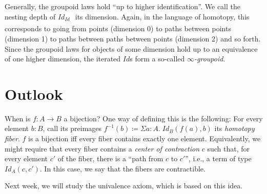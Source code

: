 \documentclass{article} \usepackage{chtt-notes} \usepackage{stmaryrd}
\begin{document}
Generally, the groupoid laws hold ``up to higher identification''.
We call the nesting depth of $\mathit{Id}_{\mathit{Id}_{._{._{.}}}}$ its dimension.
Again, in the language of homotopy, this corresponds to going from points (dimension 0) to paths between points (dimension 1) to paths between paths between points (dimension 2) and so forth.
Since the groupoid laws for objects of some dimension hold up to an equivalence of one higher dimension, the iterated $\mathit{Id}$s form a so-called \emph{$\infty$-groupoid}.

\section{Outlook}
When is $f : A \to B$ a bijection?
One way of defining this is the following:
For every element $b : B$, call its preimages $f^{-1}(b) \coloneqq \Sigma a: A. \; \mathit{Id}_{B}(f(a), b)$ its \emph{homotopy fiber}.
$f$ is a bijection iff every fiber contains exactly one element.
Equivalently, we might require that every fiber contains a \emph{center of contraction} $c$ such that, for every element $c'$ of the fiber, there is a ``path from $c$ to $c'$'', i.e., a term of type $\mathit{Id}_A(c, c')$.
In this case, we say that the fibers are contractible.

Next week, we will study the univalence axiom, which is based on this idea.
\end{document}
